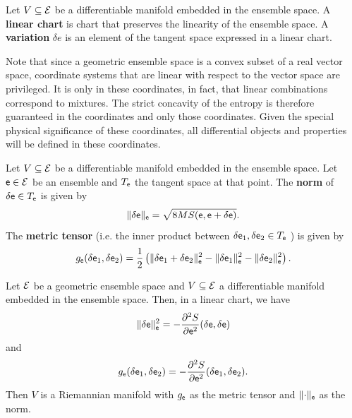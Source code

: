 \begin{defn}
	Let $V \subseteq \mathcal{E}$ be a differentiable manifold embedded in the ensemble space. A \textbf{linear chart} is chart that preserves the linearity of the ensemble space. A \textbf{variation} $\delta e$ is an element of the tangent space expressed in a linear chart.
\end{defn}

\begin{remark}
	Note that since a geometric ensemble space is a convex subset of a real vector space, coordinate systems that are linear with respect to the vector space are privileged. It is only in these coordinates, in fact, that linear combinations correspond to mixtures. The strict concavity of the entropy is therefore guaranteed in the coordinates and only those coordinates. Given the special physical significance of these coordinates, all differential objects and properties will be defined in these coordinates.
\end{remark}

\begin{defn}
	Let $V \subseteq \mathcal{E}$ be a differentiable manifold embedded in the ensemble space. Let $\mathsf{e} \in \mathcal{E}$ be an ensemble and $T_{\mathsf{e}}$ the tangent space at that point. The \textbf{norm} of $\delta \mathsf{e} \in T_{\mathsf{e}}$ is given by
	$$ \lVert \delta \mathsf{e} \rVert_{\mathsf{e}} = \sqrt{ 8 MS(\mathsf{e}, \mathsf{e} + \delta \mathsf{e}) }.$$
	The \textbf{metric tensor} (i.e. the inner product between $\delta \mathsf{e}_1 , \delta \mathsf{e}_2 \in T_{\mathsf{e}}$ ) is given by
	$$ g_{\mathsf{e}}( \delta \mathsf{e}_1, \delta \mathsf{e}_2 ) = \frac{1}{2} \left( \lVert \delta \mathsf{e}_1 + \delta \mathsf{e}_2 \rVert_{\mathsf{e}}^2 - \lVert \delta \mathsf{e}_1 \rVert_{\mathsf{e}}^2 - \lVert \delta \mathsf{e}_2 \rVert_{\mathsf{e}}^2 \right).$$
\end{defn}

\begin{thrm}
	Let $\mathcal{E}$ be a geometric ensemble space and $V \subseteq \mathcal{E}$ a differentiable manifold embedded in the ensemble space. Then, in a linear chart, we have
	$$ \lVert \delta \mathsf{e} \rVert_{\mathsf{e}}^2 = - \frac{\partial^2 S}{\partial \mathsf{e}^2}(\delta \mathsf{e} , \delta \mathsf{e}) $$
	and 
	$$ g_{\mathsf{e}}( \delta \mathsf{e}_1, \delta \mathsf{e}_2 ) = - \frac{\partial^2 S}{\partial \mathsf{e} ^2}( \delta \mathsf{e}_1, \delta \mathsf{e}_2 ).$$
	Then $V$ is a Riemannian manifold with $g_{\mathsf{e}}$ as the metric tensor and $\lVert \cdot \rVert_{\mathsf{e}}$ as the norm.
\end{thrm}

